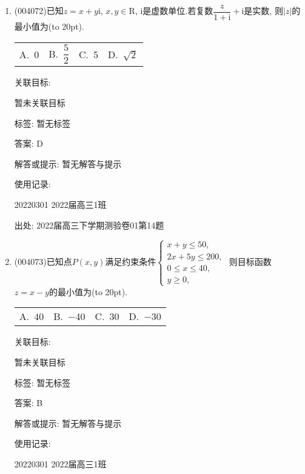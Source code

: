 \documentclass[10pt,a4paper]{article}
\newcommand{\bracket}[1]{(\hbox to #1pt{})}
\newcommand{\fourch}[4]{\par\begin{tabular}{p{.23\textwidth}p{.23\textwidth}p{.23\textwidth}p{.23\textwidth}}
A.~#1 &B.~#2& C.~#3& D.~#4
\end{tabular}}
\begin{document}
\begin{enumerate}[1.]
关联目标:

暂未关联目标



标签: 暂无标签

答案: B

解答或提示: 暂无解答与提示

使用记录:

20220301	2022届高三1班	


出处: 2022届高三下学期测验卷01第13题
\item { (004072)}已知$z=x+y\mathrm{i}$, $x,y\in \mathrm{R}$, $\mathrm{i}$是虚数单位.若复数$\dfrac z{1+\mathrm{i}}+\mathrm{i}$是实数, 则$|z|$的最小值为\bracket{20}.
\fourch{$0$}{$\dfrac 52$}{5}{$\sqrt 2$}


关联目标:

暂未关联目标



标签: 暂无标签

答案: D

解答或提示: 暂无解答与提示

使用记录:

20220301	2022届高三1班	


出处: 2022届高三下学期测验卷01第14题
\item { (004073)}已知点$P(x,y)$满足约束条件$\begin{cases} x+y\le 50,\\ 2x+5y\le 200, \\ 0\le x\le 40, \\ y\ge 0, \end{cases}$ 则目标函数$z=x-y$的最小值为\bracket{20}.
\fourch{$40$}{$-40$}{$30$}{$-30$}


关联目标:

暂未关联目标



标签: 暂无标签

答案: B

解答或提示: 暂无解答与提示

使用记录:

20220301	2022届高三1班	



\end{enumerate}
\end{document}
